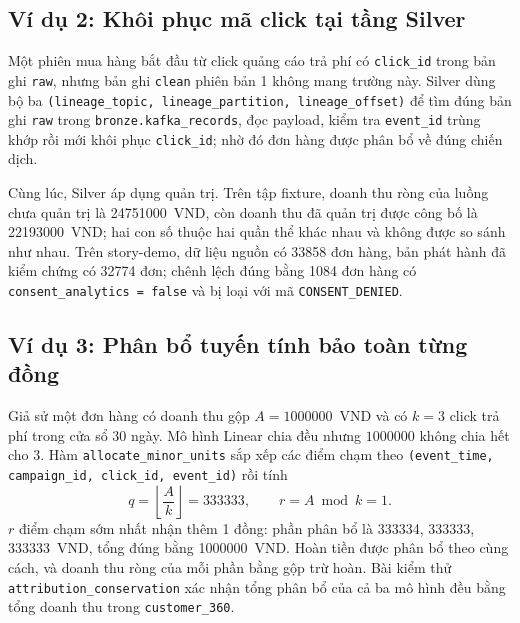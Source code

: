 \subsection{Ví dụ 2: Khôi phục mã click tại tầng Silver}
\label{sec:c3-vi-du-2}
Một phiên mua hàng bắt đầu từ click quảng cáo trả phí có \texttt{click\_id} trong bản ghi \texttt{raw}, nhưng bản ghi \texttt{clean} phiên bản 1 không mang trường này. Silver dùng bộ ba \texttt{(lineage\_topic, lineage\_partition, lineage\_offset)} để tìm đúng bản ghi \texttt{raw} trong \texttt{bronze.kafka\_records}, đọc payload, kiểm tra \texttt{event\_id} trùng khớp rồi mới khôi phục \texttt{click\_id}; nhờ đó đơn hàng được phân bổ về đúng chiến dịch.

Cùng lúc, Silver áp dụng quản trị. Trên tập fixture, doanh thu ròng của luồng chưa quản trị là \num{24751000}~VND, còn doanh thu đã quản trị được công bố là \num{22193000}~VND; hai con số thuộc hai quần thể khác nhau và không được so sánh như nhau. Trên story-demo, dữ liệu nguồn có \num{33858} đơn hàng, bản phát hành đã kiểm chứng có \num{32774} đơn; chênh lệch đúng bằng \num{1084} đơn hàng có \texttt{consent\_analytics = false} và bị loại với mã \texttt{CONSENT\_DENIED}.

\subsection{Ví dụ 3: Phân bổ tuyến tính bảo toàn từng đồng}
\label{sec:c3-vi-du-3}
Giả sử một đơn hàng có doanh thu gộp $A = \num{1000000}$~VND và có $k = 3$ click trả phí trong cửa sổ 30 ngày. Mô hình Linear chia đều nhưng $\num{1000000}$ không chia hết cho 3. Hàm \texttt{allocate\_minor\_units} sắp xếp các điểm chạm theo \texttt{(event\_time, campaign\_id, click\_id, event\_id)} rồi tính
\[
  q = \left\lfloor \frac{A}{k} \right\rfloor = \num{333333}, \qquad r = A \bmod k = 1 .
\]
$r$ điểm chạm sớm nhất nhận thêm 1 đồng: phần phân bổ là \num{333334}, \num{333333}, \num{333333}~VND, tổng đúng bằng \num{1000000}~VND. Hoàn tiền được phân bổ theo cùng cách, và doanh thu ròng của mỗi phần bằng gộp trừ hoàn. Bài kiểm thử \texttt{attribution\_conservation} xác nhận tổng phân bổ của cả ba mô hình đều bằng tổng doanh thu trong \texttt{customer\_360}.

